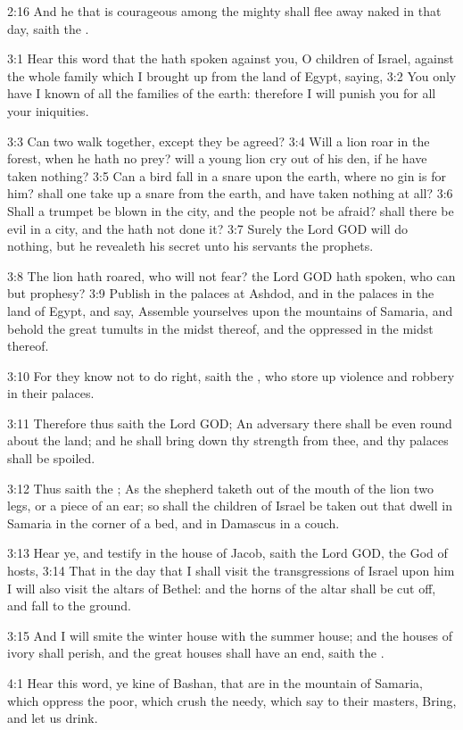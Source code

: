 2:16 And he that is courageous among the mighty shall flee away naked
in that day, saith the \LORD.

3:1 Hear this word that the \LORD hath spoken against you, O children
of Israel, against the whole family which I brought up from the land
of Egypt, saying, 3:2 You only have I known of all the families of the
earth: therefore I will punish you for all your iniquities.

3:3 Can two walk together, except they be agreed?  3:4 Will a lion
roar in the forest, when he hath no prey? will a young lion cry out of
his den, if he have taken nothing?  3:5 Can a bird fall in a snare
upon the earth, where no gin is for him?  shall one take up a snare
from the earth, and have taken nothing at all?  3:6 Shall a trumpet be
blown in the city, and the people not be afraid?  shall there be evil
in a city, and the \LORD hath not done it?  3:7 Surely the Lord GOD
will do nothing, but he revealeth his secret unto his servants the
prophets.

3:8 The lion hath roared, who will not fear? the Lord GOD hath spoken,
who can but prophesy?  3:9 Publish in the palaces at Ashdod, and in
the palaces in the land of Egypt, and say, Assemble yourselves upon
the mountains of Samaria, and behold the great tumults in the midst
thereof, and the oppressed in the midst thereof.

3:10 For they know not to do right, saith the \LORD, who store up
violence and robbery in their palaces.

3:11 Therefore thus saith the Lord GOD; An adversary there shall be
even round about the land; and he shall bring down thy strength from
thee, and thy palaces shall be spoiled.

3:12 Thus saith the \LORD; As the shepherd taketh out of the mouth of
the lion two legs, or a piece of an ear; so shall the children of
Israel be taken out that dwell in Samaria in the corner of a bed, and
in Damascus in a couch.

3:13 Hear ye, and testify in the house of Jacob, saith the Lord GOD,
the God of hosts, 3:14 That in the day that I shall visit the
transgressions of Israel upon him I will also visit the altars of
Bethel: and the horns of the altar shall be cut off, and fall to the
ground.

3:15 And I will smite the winter house with the summer house; and the
houses of ivory shall perish, and the great houses shall have an end,
saith the \LORD.

4:1 Hear this word, ye kine of Bashan, that are in the mountain of
Samaria, which oppress the poor, which crush the needy, which say to
their masters, Bring, and let us drink.

